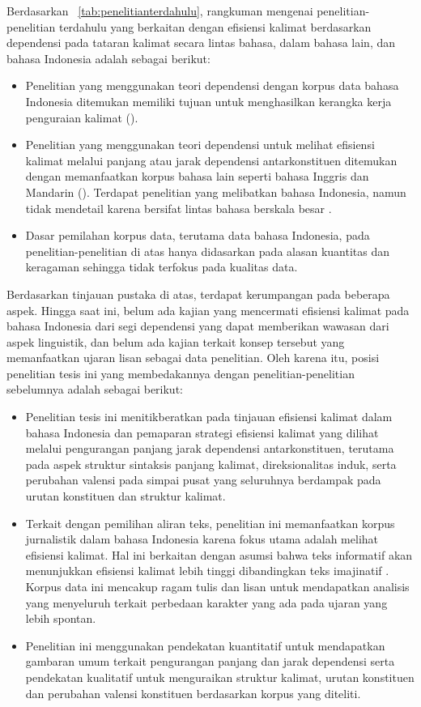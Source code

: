 Berdasarkan \tab~\ref{tab:penelitianterdahulu}, rangkuman mengenai penelitian-penelitian terdahulu yang berkaitan dengan efisiensi kalimat berdasarkan dependensi pada tataran kalimat secara lintas bahasa, dalam bahasa lain, dan bahasa Indonesia adalah sebagai berikut:
\begin{itemize}
\item Penelitian yang menggunakan teori dependensi dengan korpus data bahasa Indonesia ditemukan memiliki tujuan untuk menghasilkan kerangka kerja penguraian kalimat (\citealp{kamayani2011dependency, green2012indonesian, irmawati2015dependency}).
\item Penelitian yang menggunakan teori dependensi untuk melihat efisiensi kalimat melalui panjang atau jarak dependensi antarkonstituen ditemukan dengan memanfaatkan korpus bahasa lain seperti bahasa Inggris dan Mandarin (\citealp{jiang2015effects, wang2017effects}). Terdapat penelitian yang melibatkan bahasa Indonesia, namun tidak mendetail karena bersifat lintas bahasa berskala besar \citep{futrell2015large}.
\item Dasar pemilahan korpus data, terutama data bahasa Indonesia, pada penelitian-penelitian di atas hanya didasarkan pada alasan kuantitas dan keragaman sehingga tidak terfokus pada kualitas data. 
\end{itemize}
Berdasarkan tinjauan pustaka di atas, terdapat kerumpangan pada beberapa aspek. Hingga saat ini, belum ada kajian yang mencermati efisiensi kalimat pada bahasa Indonesia dari segi dependensi yang dapat memberikan wawasan dari aspek linguistik, dan belum ada kajian terkait konsep tersebut yang memanfaatkan ujaran lisan sebagai data penelitian. Oleh karena itu, posisi penelitian tesis ini yang membedakannya dengan penelitian-penelitian sebelumnya adalah sebagai berikut:
\begin{itemize}
\item Penelitian tesis ini menitikberatkan pada tinjauan efisiensi kalimat dalam bahasa Indonesia dan pemaparan strategi efisiensi kalimat yang dilihat melalui pengurangan panjang jarak dependensi antarkonstituen, terutama pada aspek struktur sintaksis panjang kalimat, direksionalitas induk, serta perubahan \gls{valensi} pada simpai pusat yang seluruhnya berdampak pada urutan konstituen dan struktur kalimat.
\item Terkait dengan pemilihan aliran teks, penelitian ini memanfaatkan korpus jurnalistik dalam bahasa Indonesia karena fokus utama adalah melihat efisiensi kalimat. Hal ini berkaitan dengan asumsi bahwa teks informatif akan menunjukkan efisiensi kalimat lebih tinggi dibandingkan teks imajinatif \citep{wang2017effects}. Korpus data ini mencakup ragam tulis dan lisan untuk mendapatkan analisis yang menyeluruh terkait perbedaan karakter yang ada pada ujaran yang lebih spontan.
\item Penelitian ini menggunakan pendekatan kuantitatif untuk mendapatkan gambaran umum terkait pengurangan panjang dan jarak dependensi serta pendekatan kualitatif untuk menguraikan struktur kalimat, urutan konstituen dan perubahan valensi konstituen berdasarkan korpus yang diteliti.
\end{itemize}

